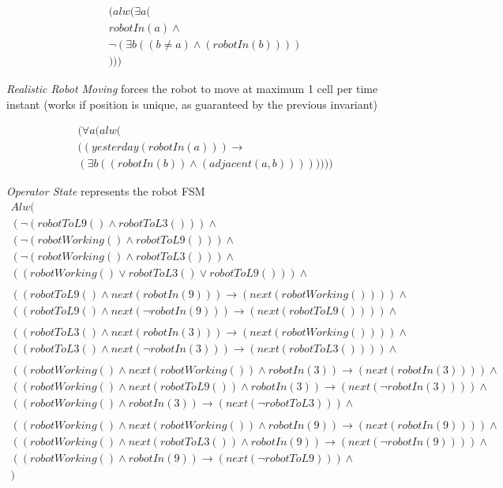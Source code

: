 \begin{align*}
	(alw(\exists a (\\
	robotIn(a)\land\\
	\neg(\exists b ((b\neq a)\land(robotIn(b))))\\
	)))
\end{align*}


\textit{Realistic Robot Moving} forces the robot to move at maximum 1 cell per time instant (works if position is unique, as guaranteed by the previous invariant)

\begin{align*}
	(\forall a (alw(\\
	((yesterday(robotIn(a)))\longrightarrow\\
	(\exists b ((robotIn(b))\land(adjacent(a,b)))) )
	)))
\end{align*}


\textit{Operator State} represents the robot FSM
\begin{align*}
	Alw(\\
	(\neg(robotToL9()\land robotToL3())) \land\\
	(\neg(robotWorking()\land robotToL9())) \land\\
	(\neg(robotWorking()\land robotToL3())) \land\\
	((robotWorking()\lor robotToL3()\lor robotToL9())) \land\\
	\\
	((robotToL9()\land next(robotIn(9)))\longrightarrow(next(robotWorking())))\land\\
	((robotToL9()\land next(\neg robotIn(9)))\longrightarrow(next(robotToL9())))\land\\
	\\
	((robotToL3()\land next(robotIn(3)))\longrightarrow(next(robotWorking())))\land\\
	((robotToL3()\land next(\neg robotIn(3)))\longrightarrow(next(robotToL3())))\land\\
	\\
	((robotWorking()\land next(robotWorking())\land robotIn(3))\longrightarrow(next(robotIn(3))))\land\\
	((robotWorking()\land next(robotToL9())\land robotIn(3))\longrightarrow(next(\neg robotIn(3))))\land\\
	((robotWorking()\land robotIn(3))\longrightarrow(next(\neg robotToL3)))\land\\
	\\
	((robotWorking()\land next(robotWorking())\land robotIn(9))\longrightarrow(next(robotIn(9))))\land\\
	((robotWorking()\land next(robotToL3())\land robotIn(9))\longrightarrow(next(\neg robotIn(9))))\land\\
	((robotWorking()\land robotIn(9))\longrightarrow(next(\neg robotToL9)))\land\\
)
\end{align*}

